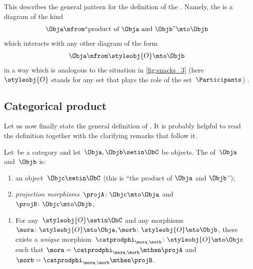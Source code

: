 This describes the general pattern for the definition of the .
Namely, the  is a diagram of the kind
\begin{equation}
    \label{eq:prod-inline-generic-diagram}
    \Obja \mfrom \text{``product of } \Obja \text{ and } \Objb \text{''} \mto \Objb
\end{equation}
which interacts with any other diagram of the form
\begin{equation}
    \label{eq:prod-inline-test-diagram}
    \Obja \mfrom \styleobj{O} \mto \Objb
\end{equation}
in a way which is analogous to the situation in \cref{fig:snacks_3} (here~$\styleobj{O}$ stands for any set that plays the role of the set~$\Participants$) .

\subsection{Categorical product}

Let us now finally state the general definition of .
It is probably helpful to read the definition together with the clarifying remarks that follow it.

\begin{ctdefinition}
    \label{def:categorical-product}
    Let~\CatC be a category and let~$\Obja, \Objb \setin \ObC$ be objects.
    The  of~$\Obja$ and~$\Objb$ is: \\
    \constit
    \begin{enumerate}
        \item an object~$\Objc \setin \ObC$ (this is ``the product of $\Obja$ and $\Objb$'');
        \item \emph{projection morphisms}~$\projA \colon \Objc \mto \Obja$ and~$\projB \colon \Objc \mto \Objb$,
    \end{enumerate}
    \condit
    \begin{enumerate}
        \item For any~$\styleobj{O} \setin \ObC$ and any morphisms~$\mora \colon \styleobj{O} \mto \Obja, \morb \colon \styleobj{O} \mto \Objb$, there exists a \emph{unique} morphism~$\catprodphi_{\mora,\morb} \colon \styleobj{O} \mto \Objc$ such that $\mora = \catprodphi_{\mora,
                      \morb} \mthen \projA$ and $\morb=\catprodphi_{\mora, \morb}\mthen \projB$.
    \end{enumerate}
\end{ctdefinition}

